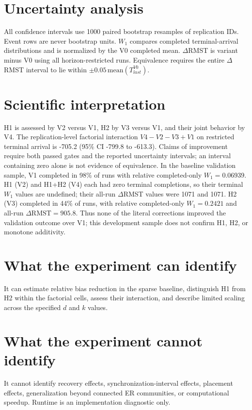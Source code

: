 \documentclass[11pt]{article}
\begin{document}
\section{Uncertainty analysis}
All confidence intervals use 1000 paired bootstrap resamples of
replication IDs. Event rows are never bootstrap units. $W_1$ compares completed
terminal-arrival distributions and is normalized by the V0 completed mean.
$\Delta$RMST is variant minus V0 using all horizon-restricted runs. Equivalence
requires the entire $\Delta$RMST interval to lie within
$\pm0.05\,\mathrm{mean}(T_{last}^{V0})$.

\section{Scientific interpretation}
H1 is assessed by V2 versus V1, H2 by V3 versus V1, and their joint behavior by
V4. The replication-level factorial interaction $V4-V2-V3+V1$ on restricted
terminal arrival is -705.2 (95\% CI -799.8 to -613.3). Claims of improvement require both passed
gates and the reported uncertainty intervals; an interval containing zero alone
is not evidence of equivalence. In the baseline validation sample, V1 completed in 98\% of runs with relative completed-only $W_1=0.06939$. H1 (V2) and H1+H2 (V4) each had zero terminal completions, so their terminal $W_1$ values are undefined; their all-run $\Delta$RMST values were 1071 and 1071. H2 (V3) completed in 44\% of runs, with relative completed-only $W_1=0.2421$ and all-run $\Delta\mathrm{RMST}=905.8$. Thus none of the literal corrections improved the validation outcome over V1; this development sample does not confirm H1, H2, or monotone additivity.

\section{What the experiment can identify}
It can estimate relative bias reduction in the sparse baseline, distinguish H1
from H2 within the factorial cells, assess their interaction, and describe limited
scaling across the specified $d$ and $k$ values.

\section{What the experiment cannot identify}
It cannot identify recovery effects, synchronization-interval effects, placement
effects, generalization beyond connected ER communities, or computational speedup.
Runtime is an implementation diagnostic only.
\end{document}

